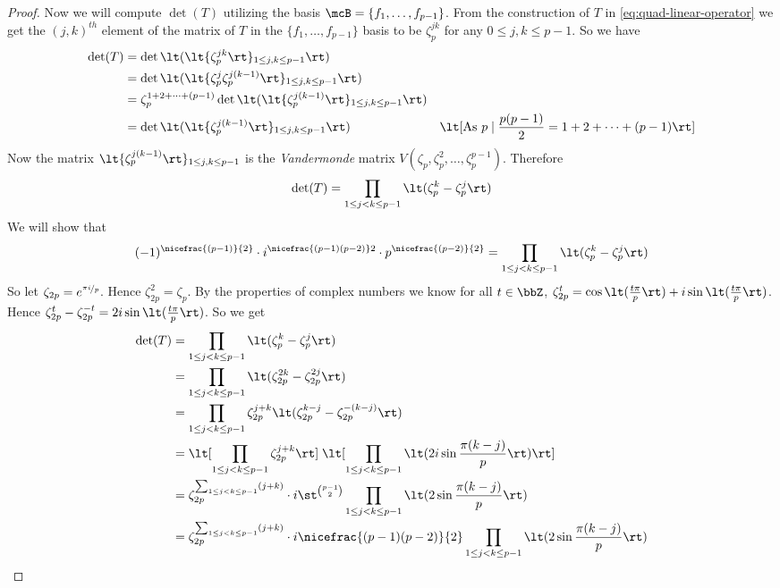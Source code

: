 \begin{proof}
  Now we will compute $\det(T)$ utilizing the basis $\mcB=\{f_1,\dots, f_{p-1}\}$. From the construction of $T$ in \eqref{eq:quad-linear-operator} we get the $(j,k)^{th}$ element of the matrix of $T$ in the $\{f_1,\dots, f_{p-1}\}$ basis to be $\zeta_p^{jk}$ for any $0\leq j,k\leq p-1$. So we have \begin{align*}
    \det(T)& =\det\lt( \lt\{\zeta_p^{jk}\rt\}_{1\leq j,k\leq p-1}\rt)\\ 
    & = \det\lt( \lt\{\zeta_p^j\zeta_p^{j(k-1)}\rt\}_{1\leq j,k\leq p-1}\rt)\\ 
    & = \zeta_p^{1+2+\cdots+(p-1)}\det\lt( \lt\{\zeta_p^{j(k-1)}\rt\}_{1\leq j,k\leq p-1}\rt)\\ 
    & = \det\lt( \lt\{\zeta_p^{j(k-1)}\rt\}_{1\leq j,k\leq p-1}\rt) & \lt[\text{As }p\mid \frac{p(p-1)}2=1+2+\cdots+(p-1)\rt]
  \end{align*}
  Now the matrix $\lt\{\zeta_p^{j(k-1)}\rt\}_{1\leq j,k\leq p-1}$ is the \emph{Vandermonde} matrix $V(\zeta_p,\zeta_p^2,\dots, \zeta_p^{p-1})$. Therefore $$\det(T)=\prod_{1\leq j<k\leq p-1}\lt(\zeta_p^k-\zeta_p^j\rt)$$We will show that 
  \begin{equation}\label{eq:quadratic-gaussian-det}
    (-1)^{\nicefrac{(p-1)}{2}}\cdot i^{\nicefrac{(p-1)(p-2)}2}\cdot p^{\nicefrac{(p-2)}{2}}=\prod_{1\leq j<k\leq p-1}\lt(\zeta_p^k-\zeta_p^j\rt)
  \end{equation}
  So let $\zeta_{2p}=e^{\nicefrac{\pi i}{p}}$. Hence $\zeta_{2p}^2=\zeta_p$. By the properties of complex numbers we know for all $t\in\bbZ$, $\zeta_{2p}^t=\cos\lt(\frac{t\pi}{p}\rt)+i\sin\lt(\frac{t\pi}p\rt)$. Hence $\zeta_{2p}^t-\zeta_{2p}^{-t}=2i\sin\lt(\frac{t\pi}p\rt)$. So we get \begin{align*}
    \det(T) & = \prod_{1\leq j<k\leq p-1}\lt(\zeta_p^k-\zeta_p^j\rt)\\
    & = \prod_{1\leq j<k\leq p-1}\lt(\zeta_{2p}^{2k}-\zeta_{2p}^{2j}\rt)\\
    & = \prod_{1\leq j<k\leq p-1}\zeta_{2p}^{j+k}\lt(\zeta_{2p}^{k-j}-\zeta_{2p}^{-(k-j)}\rt)\\ 
    & =  \lt[\prod_{1\leq j<k\leq p-1}\zeta_{2p}^{j+k} \rt]\;\lt[\prod_{1\leq j<k\leq p-1} \lt(2i\sin\frac{\pi(k-j)}{p}\rt) \rt]\\ 
    & = \zeta_{2p}^{\sum_{1\leq j<k\leq p-1}(j+k)} \cdot i\st^{\binom{p-1}{2}}\prod_{1\leq j<k\leq p-1} \lt(2\sin\frac{\pi(k-j)}{p}\rt) \\ 
    & = \zeta_{2p}^{\sum_{1\leq j<k\leq p-1}(j+k)} \cdot i{\nicefrac{(p-1)(p-2)}  {2}}\prod_{1\leq j<k\leq p-1} \lt(2\sin\frac{\pi(k-j)}{p}\rt) 

\end{align*}
\end{proof}
